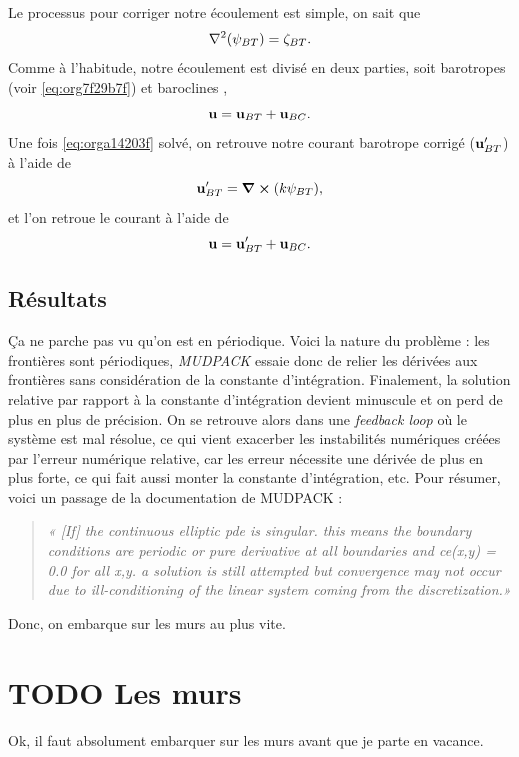 \documentclass[10pt]{report}
\numberwithin{equation}{section}
\newcommand{\uu}{\vb{u}}
\begin{document}
Le processus pour corriger notre écoulement est simple, on sait que
\begin{equation}
\label{eq:orga14203f}
   \laplacian(\psi_{BT}) = \zeta_{BT}.
\end{equation}
Comme à l'habitude, notre écoulement est divisé en deux parties, soit barotropes (voir \ref{eq:org7f29b7f}) et baroclines ,
\begin{equation}
   \uu = \uu_{BT} + \uu_{BC}.
\end{equation}
Une fois \ref{eq:orga14203f} solvé, on retrouve notre courant barotrope corrigé (\(\uu_{BT}'\)) à l'aide de
\begin{equation}
   \uu_{BT}' = \curl(k\psi_{BT}),
\end{equation}
et l'on retroue le courant à l'aide de
\begin{equation}
   \uu = \uu_{BT}' + \uu_{BC}.
\end{equation}


\subsection{Résultats}
\label{sec:org1d12606}
Ça ne parche pas vu qu'on est en périodique.
Voici la nature du problème : les frontières sont périodiques, \emph{MUDPACK} essaie donc de relier les dérivées aux frontières sans considération de la constante d'intégration.
Finalement, la solution relative par rapport à la constante d'intégration devient minuscule et on perd de plus en plus de précision.
On se retrouve alors dans une \emph{feedback loop} où le système est mal résolue, ce qui vient exacerber les instabilités numériques créées par l'erreur numérique relative, car les erreur nécessite une dérivée de plus en plus forte, ce qui fait aussi monter la constante d'intégration, etc.
Pour résumer, voici un passage de la documentation de MUDPACK :

\begin{quote}
\emph{« [If] the continuous elliptic pde is singular.  this means the boundary conditions are periodic or pure derivative at all boundaries and ce(x,y) = 0.0 for all x,y.  a solution is still attempted but convergence may not occur due to ill-conditioning of the linear system coming from the discretization.»}
\end{quote}

Donc, on embarque sur les murs au plus vite.

\section{{\bfseries\sffamily TODO} Les murs}
\label{sec:org7d5453f}
Ok, il faut absolument embarquer sur les murs avant que je parte en vacance.
\end{document}
